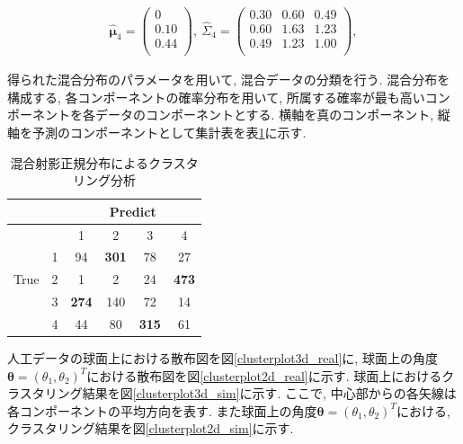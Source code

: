 \documentclass[a4j,12pt]{jarticle}
\begin{document}
\begin{equation}
\begin{split}
\hat{\bm \mu}_4 = \begin{pmatrix} 0 \\ 0.10 \\ 0.44 \\ \end{pmatrix},\ 
\hat \Sigma_4 = \begin{pmatrix} 0.30 & 0.60 & 0.49 \\ 0.60 & 1.63 & 1.23 \\ 0.49 & 1.23 &1.00 \\ \end{pmatrix},
\end{split}
\end{equation}

得られた混合分布のパラメータを用いて, 混合データの分類を行う. 混合分布を構成する, 各コンポーネントの確率分布を用いて, 所属する確率が最も高いコンポーネントを各データのコンポーネントとする.
横軸を真のコンポーネント, 縦軸を予測のコンポーネントとして集計表を表\ref{cross}に示す.

\begin{table}[tbp]
\begin{center}
\caption{混合射影正規分布によるクラスタリング分析}
\label{cross}
\begin{tabular}{c|c|c c c c}
\hline
 &  & \multicolumn{4}{c}{Predict} \\ \hline
 &  & 1 & 2 & 3 & 4  \\ \hline 
 & 1 & 94 & \textbf{301} & 78 & 27 \\ 
True
 & 2 & 1 & 2 & 24 & \textbf{473} \\
 & 3 & \textbf{274} & 140 & 72 & 14 \\ 
 & 4 & 44 & 80 & \textbf{315} & 61 \\ 
\hline
\end{tabular}
\end{center}
\end{table}

人工データの球面上における散布図を図\ref{clusterplot3d_real}に, 球面上の角度$\bm \theta = (\theta_1, \theta_2)^T$における散布図を図\ref{clusterplot2d_real}に示す. 球面上におけるクラスタリング結果を図\ref{clusterplot3d_sim}に示す. ここで, 中心部からの各矢線は各コンポーネントの平均方向を表す. また球面上の角度$\bm \theta = (\theta_1, \theta_2)^T$における, クラスタリング結果を図\ref{clusterplot2d_sim}に示す.
\end{document}
